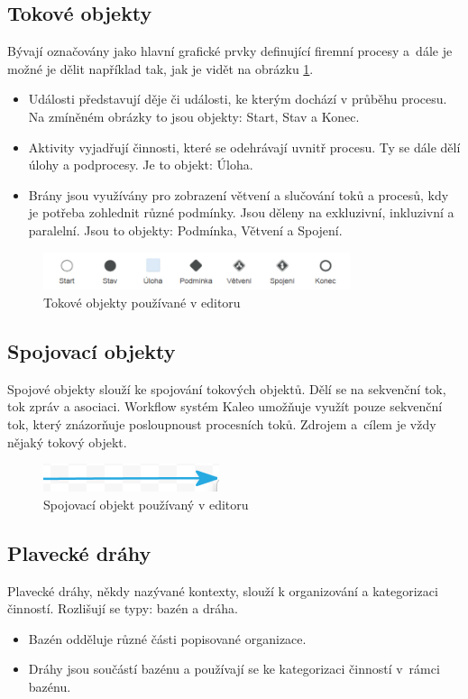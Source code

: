 \documentclass{fithesis}
\begin{document}
\subsection*{Tokové objekty}
Bývají označovány jako hlavní grafické prvky definující firemní procesy a~dále je možné je dělit například tak, jak je vidět na obrázku \ref{fig:tokove_objekty}.
\begin{itemize}
\item Události představují děje či události, ke kterým dochází v průběhu procesu. Na zmíněném obrázky to jsou objekty: Start, Stav a Konec.
\item Aktivity vyjadřují činnosti, které se odehrávají uvnitř procesu. Ty se dále dělí úlohy a podprocesy. Je to objekt: Úloha.
\item Brány jsou využívány pro zobrazení větvení a slučování toků a procesů, kdy je potřeba zohlednit různé podmínky. Jsou děleny na exkluzivní, inkluzivní a paralelní. Jsou to objekty: Podmínka, Větvení a Spojení.
\end{itemize}

\begin{figure}[htp]
\centering
\includegraphics[width=340px]{images/tokove_objekty.png}
\caption{Tokové objekty používané v editoru}
\label{fig:tokove_objekty}
\end{figure}

\subsection*{Spojovací objekty}
Spojové objekty slouží ke spojování tokových objektů. Dělí se na sekvenční tok, tok zpráv a asociaci. Workflow systém Kaleo umožňuje využít pouze sekvenční tok, který znázorňuje posloupnoust procesních toků. Zdrojem a~cílem je vždy nějaký tokový objekt.

\begin{figure}[htp]
\centering
\includegraphics{images/spoj_objekty.png}
\caption{Spojovací objekt používaný v editoru}
\end{figure}

\subsection*{Plavecké dráhy}
Plavecké dráhy, někdy nazývané kontexty, slouží k organizování a kategorizaci činností. Rozlišují se typy: bazén a dráha.
\begin{itemize}
\item Bazén odděluje různé části popisované organizace.
\item Dráhy jsou součástí bazénu a používají se ke kategorizaci činností v~rámci bazénu.
\end{itemize}
\end{document}
